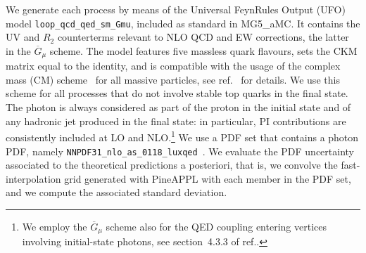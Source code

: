 We generate each process by means of the Universal FeynRules Output
(UFO)~\cite{Degrande:2011ua} model {\tt loop\_qcd\_qed\_sm\_Gmu},
included as standard in {\sc MG5\_aMC}. It contains the UV and $R_2$
counterterms relevant to NLO QCD and EW corrections, the latter in the
$\overline{G}_\mu$ scheme. The model features five massless quark flavours,
sets the CKM matrix equal to the identity, and is compatible with the usage of
the complex mass (CM) scheme~\cite{Denner:1999gp,Denner:2005fg} for all massive particles, see
ref.~\cite{Frederix:2018nkq} for details. We use this scheme
for all processes that do not involve stable top quarks in the final state.
The photon is always considered as part of the proton in the initial state and
of any hadronic jet produced in the final state: 
 in particular, PI contributions are consistently included at LO and NLO.\footnote{We employ the $\overline{G}_\mu$ scheme also for the QED coupling entering vertices involving initial-state photons, see section~4.3.3 of ref.\cite{Denner:2019vbn}.}
We use a PDF set that contains a photon PDF, namely
{\tt NNPDF31\_nlo\_as\_0118\_luxqed}~\cite{Bertone:2017bme}. We evaluate the PDF
uncertainty associated to the theoretical predictions a posteriori, that is,
we convolve the fast-interpolation grid generated with {\sc PineAPPL} with
each member in the PDF set, and we compute the associated standard deviation.

